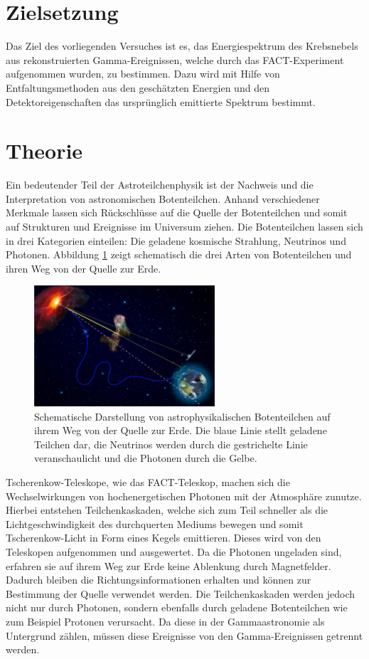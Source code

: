 \section{Zielsetzung}
Das Ziel des vorliegenden Versuches ist es, das Energiespektrum des Krebsnebels aus rekonstruierten Gamma-Ereignissen, welche durch das FACT-Experiment aufgenommen wurden, zu bestimmen. Dazu wird mit Hilfe von Entfaltungsmethoden aus den geschätzten Energien und den Detektoreigenschaften das ursprünglich emittierte Spektrum bestimmt.

\section{Theorie}
Ein bedeutender Teil der Astroteilchenphysik ist der Nachweis und die Interpretation von astronomischen Botenteilchen. Anhand verschiedener Merkmale lassen sich Rückschlüsse auf die Quelle der Botenteilchen und somit auf Strukturen und Ereignisse im Universum ziehen. Die Botenteilchen lassen sich in drei Kategorien einteilen: Die geladene kosmische Strahlung, Neutrinos und Photonen. 
Abbildung \ref{fig:Boten} zeigt schematisch die drei Arten von Botenteilchen und ihren Weg von der Quelle zur Erde.
\begin{figure}
  \centering
  \includegraphics[width=0.6\textwidth]{graphics/Folie5.png}
  \caption{Schematische Darstellung von astrophysikalischen Botenteilchen auf ihrem Weg von der Quelle zur Erde. Die blaue Linie stellt geladene Teilchen dar, die Neutrinos werden durch die gestrichelte Linie veranschaulicht und die Photonen durch die Gelbe.\cite{anleitung}}
  \label{fig:Boten}
\end{figure}
\FloatBarrier
Tscherenkow-Teleskope, wie das FACT-Teleskop, machen sich die Wechselwirkungen von hochenergetischen Photonen mit der Atmosphäre zunutze. Hierbei entstehen Teilchenkaskaden, welche sich zum Teil schneller als die Lichtgeschwindigkeit des durchquerten Mediums bewegen und somit Tscherenkow-Licht in Form eines Kegels emittieren. Dieses wird von den Teleskopen aufgenommen und ausgewertet.
Da die Photonen ungeladen sind, erfahren sie auf ihrem Weg zur Erde keine Ablenkung durch Magnetfelder. Dadurch bleiben die Richtungsinformationen erhalten und können zur Bestimmung der Quelle verwendet werden.
Die Teilchenkaskaden werden jedoch nicht nur durch Photonen, sondern ebenfalls durch geladene Botenteilchen wie zum Beispiel Protonen verursacht. Da diese in der Gammaastronomie als Untergrund zählen, müssen diese Ereignisse von den Gamma-Ereignissen getrennt werden.


